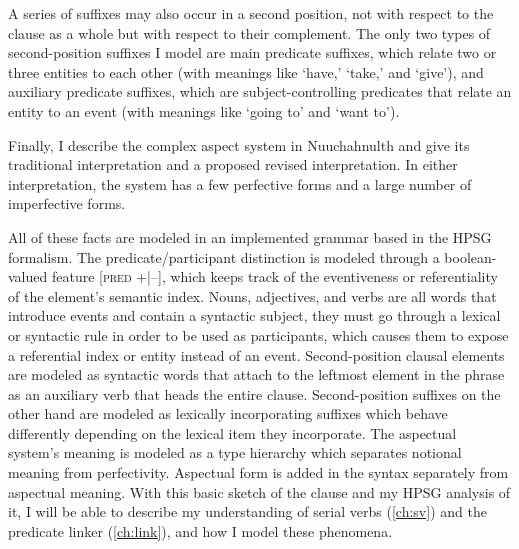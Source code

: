 A series of suffixes may also occur in a second position, not with respect to the clause as a whole but with respect to their complement. The only two types of second-position suffixes I model are main predicate suffixes, which relate two or three entities to each other (with meanings like `have,' `take,' and `give'), and auxiliary predicate suffixes, which are subject-controlling predicates that relate an entity to an event (with meanings like `going to' and `want to').

Finally, I describe the complex aspect system in Nuuchahnulth and give its traditional interpretation and a proposed revised interpretation. In either interpretation, the system has a few perfective forms and a large number of imperfective forms.

All of these facts are modeled in an implemented grammar based in the HPSG formalism. The predicate/participant distinction is modeled through a boolean-valued feature [\textsc{pred} +|--], which keeps track of the eventiveness or referentiality of the element's semantic index. Nouns, adjectives, and verbs are all words that introduce events and contain a syntactic subject, they must go through a lexical or syntactic rule in order to be used as participants, which causes them to expose a referential index or entity instead of an event. Second-position clausal elements are modeled as syntactic words that attach to the leftmost element in the phrase as an auxiliary verb that heads the entire clause. Second-position suffixes on the other hand are modeled as lexically incorporating suffixes which behave differently depending on the lexical item they incorporate. The aspectual system's meaning is modeled as a type hierarchy which separates notional meaning from perfectivity. Aspectual form is added in the syntax separately from aspectual meaning. With this basic sketch of the clause and my HPSG analysis of it, I will be able to describe my understanding of serial verbs (\cref{ch:sv}) and the predicate linker (\cref{ch:link}), and how I model these phenomena.
